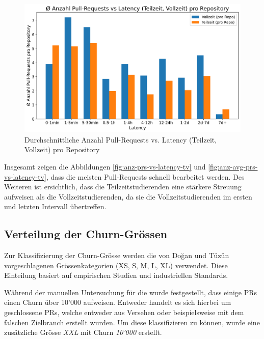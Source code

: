 \begin{figure}[htbp]
    \includegraphics[width=\textwidth]{Figures/anz-avg-prs-vs-latency-tv.pdf}
    \caption{Durchschnittliche Anzahl Pull-Requests vs. Latency (Teilzeit, Vollzeit) pro Repository}
    \label{fig:anz-avg-prs-vs-latency-tv}
\end{figure}

Insgesamt zeigen die Abbildungen \autoref{fig:anz-prs-vs-latency-tv} und \autoref{fig:anz-avg-prs-vs-latency-tv}, dass die meisten Pull-Requests schnell bearbeitet werden. Des Weiteren ist ersichtlich, dass die Teilzeitstudierenden eine stärkere Streuung aufweisen als die Vollzeitstudierenden, da sie die Vollzeitstudierenden im ersten und letzten Intervall übertreffen.

\subsection{Verteilung der Churn-Grössen}
Zur Klassifizierung der Churn-Grösse werden die von Doğan und Tüzün \parencite{dogan_towards_2022} vorgeschlagenen Grössenkategorien (XS, S, M, L, XL) verwendet. Diese Einteilung basiert auf empirischen Studien und industriellen Standards.

Während der manuellen Untersuchung für die  wurde festgestellt, dass einige PRs einen Churn über 10'000 aufweisen. Entweder handelt es sich hierbei um geschlossene PRs, welche entweder aus Versehen oder beispielsweise mit dem falschen Zielbranch erstellt wurden. Um diese klassifizieren zu können, wurde eine zusätzliche Grösse \textit{XXL} mit Churn \textit{10'000} erstellt. 

